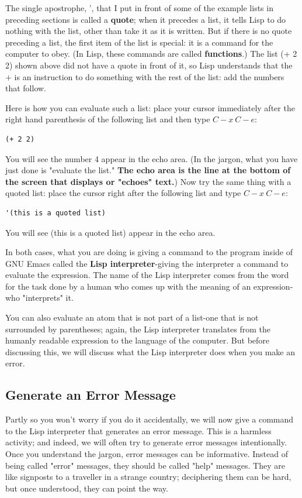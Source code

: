 \documentclass[12pt]{book}
\begin{document}
The single apostrophe, ', that I put in front of some of the example lists in preceding sections is called a {\bf quote}; when it precedes a list, it tells Lisp to do nothing with the list, other than take it as it is written. But if there is no quote preceding a list, the first item of the list is special: it is a command for the computer to obey. (In Lisp, these commands are called {\bf functions}.) The list (+ 2 2) shown above did not have a quote in front of it, so Lisp understands that the $+$ is an instruction to do something with the rest of the list: add the numbers that follow.

Here is how you can evaluate such a list: place your cursor immediately after the right hand parenthesis of the following list and then type $C-x\ C-e:$
\begin{verbatim}
(+ 2 2)
\end{verbatim}
You will see the number 4 appear in the echo area. (In the jargon, what you have just done is "evaluate the list." {\bf The echo area is the line at the bottom of the screen that displays or "echoes" text.}) Now try the same thing with a quoted list: place the cursor right after the following list and type $C-x\ C-e:$ 
\begin{verbatim}
'(this is a quoted list)
\end{verbatim}
You will see (this is a quoted list) appear in the echo area.

In both cases, what you are doing is giving a command to the program inside of GNU Emacs called the {\bf Lisp interpreter}-giving the interpreter a command to evaluate the expression. The name of the Lisp interpreter comes from the word for the task done by a human who comes up with the meaning of an expression-who "interprets" it.

You can also evaluate an atom that is not part of a list-one that is not surrounded by parentheses; again, the Lisp interpreter translates from the humanly readable expression to the language of the computer. But before discussing this, we will discuss what the Lisp interpreter does when you make an error.
\subsection{Generate an Error Message}
Partly so you won't worry if you do it accidentally, we will now give a command to the Lisp interpreter that generates an error message. This is a
harmless activity; and indeed, we will often try to generate error messages intentionally. Once you understand the jargon, error messages can be informative. Instead of being called "error" messages, they should be called "help" messages. They are like signposts to a traveller in a strange country; deciphering them can be hard, but once understood, they can point the way.
\end{document}
